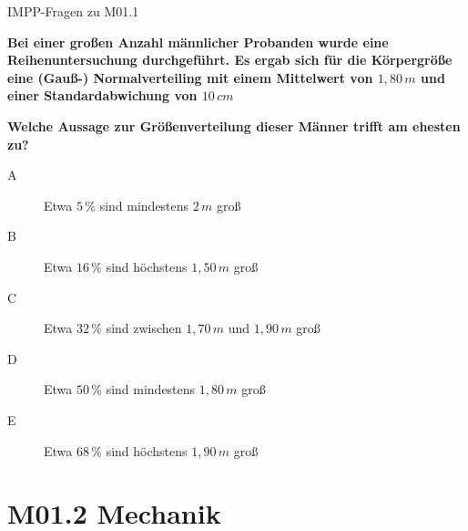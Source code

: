 \documentclass{beamer}
\begin{document}
\begin{frame}{IMPP-Fragen zu M01.1}

\textbf{Bei einer großen Anzahl männlicher Probanden wurde eine Reihenuntersuchung durchgeführt. Es ergab sich für die Körpergröße eine (Gauß-) Normalverteiling mit einem Mittelwert von \(1,80\,m\) und einer Standardabwichung von \(10\,cm\) }

\textbf{Welche Aussage zur Größenverteilung dieser Männer trifft am ehesten zu? }\\[0.2 cm]

\begin{description}
\item[A]
Etwa \(5\,\%\) sind mindestens \(2\,m\) groß
\item[B]
Etwa \(16\,\%\) sind höchstens \(1,50 \, m\) groß
\item[C] 
Etwa \(32\,\% \) sind zwischen \(1,70\,m\) und \(1,90\,m\) groß

\item[D]
\textcolor{theme}{Etwa \(50\,\%\) sind mindestens \(1,80\,m\) groß}
\item[E]
Etwa  \(68\,\%\) sind höchstens \(1,90\,m\) groß
\end{description}

    
\end{frame}




\section{M01.2 Mechanik}




\end{document}
